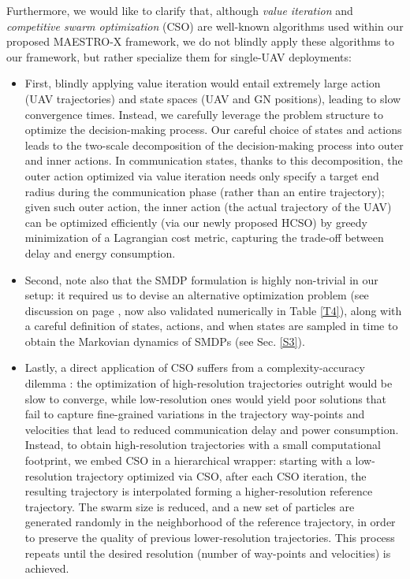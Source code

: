 \documentclass[12pt, draftcls, onecolumn]{IEEEtran}
\theoremstyle{plain}
\theoremstyle{definition}
\theoremstyle{remark}
\begin{document}
\begin{enumerate}
    Furthermore, we would like to clarify that, although \emph{value iteration} and \emph{competitive swarm optimization} (CSO) are well-known algorithms used within our proposed MAESTRO-X framework, we do not blindly apply these algorithms to our framework, but rather specialize them for single-UAV deployments:
    \begin{itemize}
        \item First, blindly applying value iteration would entail extremely large action (UAV trajectories) and state spaces (UAV and GN positions), leading to slow convergence times. Instead, we carefully leverage the problem structure to optimize the decision-making process. Our careful choice of states and actions leads to the two-scale decomposition of the decision-making process into outer and inner actions. In communication states, thanks to this decomposition, the outer action optimized via value iteration needs only specify a target end radius during the communication phase (rather than an entire trajectory); given such outer action, the inner action (the actual trajectory of the UAV) can be optimized efficiently (via our newly proposed HCSO) by greedy minimization of a Lagrangian cost metric, capturing the trade-off between delay and energy consumption.
        \item Second, note also that the SMDP formulation is highly non-trivial in our setup: it required us to devise an alternative optimization problem (see discussion on page \pageref{altopt}, now also validated numerically in Table \ref{T4}), along with a careful definition of states, actions, and when states are sampled in time to obtain the Markovian dynamics of SMDPs (see Sec. \ref{S3}).
        \item Lastly, a direct application of CSO suffers from a complexity-accuracy dilemma \cite{CSO}: the optimization of high-resolution trajectories outright would be slow to converge, while low-resolution ones would yield poor solutions that fail to capture fine-grained variations in the trajectory way-points and velocities that lead to reduced communication delay and power consumption. Instead, to obtain high-resolution trajectories with a small computational footprint, we embed CSO in a hierarchical wrapper: starting with a low-resolution trajectory optimized via CSO, after each CSO iteration, the resulting trajectory is interpolated forming a higher-resolution reference trajectory. The swarm size is reduced, and a new set of particles are generated randomly in the neighborhood of the reference trajectory, in order to preserve the quality of previous lower-resolution trajectories. This process repeats until the desired resolution (number of way-points and velocities) is achieved.
    \end{itemize}
    \vspace{2mm}
    

\end{enumerate}
\end{document}
